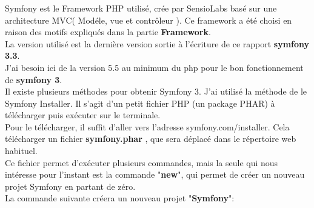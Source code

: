 \documentclass[12pt]{article}
\begin{document}
\\

\\

\\

\\

\\

\\

\\

\\

   
     
\\
\\
Symfony est le Framework PHP utilisé, crée par SensioLabs basé sur une
architecture MVC( Modéle, vue et contrôleur ). Ce framework a été choisi
en raison des motifs expliqués dans la partie \textbf{Framework}.\\
La version utilisé est la dernière version sortie à l’écriture de ce rapport \textbf{symfony 3.3}.
\\ 
J'ai besoin ici de la version 5.5 au minimum du php pour le bon fonctionnement de \textbf{symfony 3}.\\
Il existe plusieurs méthodes pour obtenir Symfony 3. J'ai utilisé la méthode de le Symfony Installer. Il s'agit d'un petit fichier PHP (un package PHAR) à télécharger puis exécuter sur le terminale.\\

Pour le télécharger, il suffit d'aller vers l'adresse  symfony.com/installer. Cela  télécharger un fichier \textbf{symfony.phar} , que sera déplacé dans le répertoire web habituel. \\
Ce fichier permet d'exécuter plusieurs commandes, mais la seule qui nous intéresse pour l'instant est la commande "\textbf{new}", qui permet de créer un nouveau projet Symfony en partant de zéro.\\
La commande suivante créera un nouveau projet  "\textbf{Symfony}":\\
\\
 \\
\end{document}
